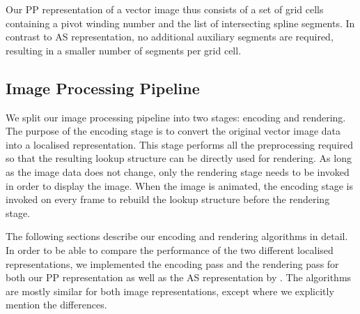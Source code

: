 \documentclass[11pt,a4paper,twoside]{article}
\begin{document}
Our PP representation of a vector image thus consists of a set of grid cells containing a pivot winding number and the list of intersecting spline segments. In contrast to AS representation, no additional auxiliary segments are required, resulting in a smaller number of segments per grid cell.

\subsection {Image Processing Pipeline}

We split our image processing pipeline into two stages: encoding and rendering. The purpose of the encoding stage is to convert the original vector image data into a localised representation. This stage performs all the preprocessing required so that the resulting lookup structure can be directly used for rendering. As long as the image data does not change, only the rendering stage needs to be invoked in order to display the image. When the image is animated, the encoding stage is invoked on every frame to rebuild the lookup structure before the rendering stage.

The following sections describe our encoding and rendering algorithms in detail. In order to be able to compare the performance of the two different localised representations, we implemented the encoding pass and the rendering pass for both our PP representation as well as the AS representation by \cite{NehabHoppe08}. The algorithms are mostly similar for both image representations, except where we explicitly mention the differences.

\end{document}
